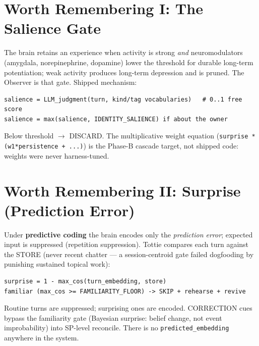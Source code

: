 \section{Worth Remembering I: The Salience Gate}
The brain retains an experience when activity is strong \emph{and} neuromodulators (amygdala,
norepinephrine, dopamine) lower the threshold for durable long-term potentiation; weak activity
produces long-term depression and is pruned. The Observer is that gate. Shipped mechanism:
\begin{Verbatim}[breaklines=true,fontsize=\small]
salience = LLM_judgment(turn, kind/tag vocabularies)   # 0..1 free score
salience = max(salience, IDENTITY_SALIENCE) if about the owner
\end{Verbatim}
Below threshold $\rightarrow$ DISCARD. The multiplicative weight equation
(\texttt{surprise * (w1*persistence + ...)}) is the Phase-B cascade target, not
shipped code: weights were never harness-tuned.

\section{Worth Remembering II: Surprise (Prediction Error)}
Under \textbf{predictive coding} the brain encodes only the \emph{prediction error}; expected input is
suppressed (repetition suppression). Tottie compares each turn against the STORE (never recent
chatter --- a session-centroid gate failed dogfooding by punishing sustained topical work):
\begin{Verbatim}[breaklines=true,fontsize=\small]
surprise = 1 - max_cos(turn_embedding, store)
familiar (max_cos >= FAMILIARITY_FLOOR) -> SKIP + rehearse + revive
\end{Verbatim}
Routine turns are suppressed; surprising ones are encoded. CORRECTION cues bypass the
familiarity gate (Bayesian surprise: belief change, not event improbability) into SP-level
reconcile. There is no \texttt{predicted\_embedding} anywhere in the system.

